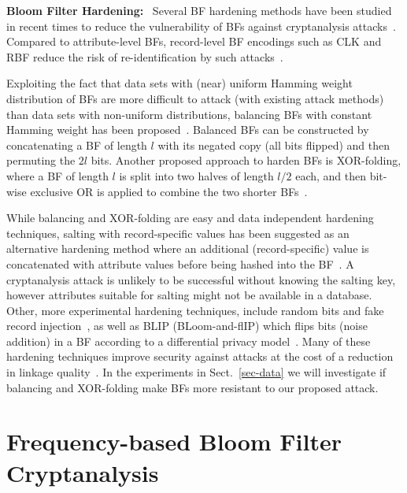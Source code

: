 \documentclass{llncs}
\begin{document}
\textbf{Bloom Filter Hardening:}~
Several BF hardening methods have been studied in recent times to
reduce the vulnerability of BFs against cryptanalysis
attacks~\cite{Sch16}. Compared to attribute-level BFs, record-level
BF encodings such as CLK and RBF reduce the risk of re-identification
by such attacks~\cite{Kuz11,Nie14}.

Exploiting the fact that data sets with (near) uniform Hamming
weight distribution of BFs are more difficult to attack (with
existing attack methods) than data sets with non-uniform
distributions, balancing BFs with constant Hamming weight has been
proposed~\cite{Sch16}. Balanced BFs can be constructed by
concatenating a BF of length $l$ with its negated copy (all bits
flipped) and then permuting the $2l$ bits. Another proposed approach
to harden BFs is XOR-folding, where a BF of length $l$ is split into
two halves of length $l/2$ each, and then bit-wise exclusive OR is
applied to combine the two shorter BFs~\cite{Sch16}.

While balancing and XOR-folding are easy and data independent
hardening techniques, salting with record-specific values has been
suggested as an alternative hardening method where an additional
(record-specific) value is concatenated with attribute values
before being hashed into the BF~\cite{Nie14}. A cryptanalysis attack
is unlikely to be successful without knowing the salting key, however
attributes suitable for salting might not be available in a database.
Other, more experimental hardening techniques, include random bits
and fake record injection~\cite{Dur14,Vat13}, as well as BLIP
(BLoom-and-flIP) which flips bits (noise addition) in a BF according 
to a differential privacy model~\cite{Sch16}. Many of these
hardening techniques improve security against attacks at the cost
of a reduction in linkage quality~\cite{Sch16}. In the experiments
in Sect.~\ref{sec-data} we will investigate if balancing and
XOR-folding make BFs more resistant to our proposed attack.


\section{Frequency-based Bloom Filter Cryptanalysis}
\label{sec-bf-attack}


\end{document}

